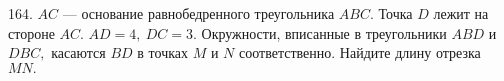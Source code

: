 164. $AC$ --- основание равнобедренного треугольника $ABC.$ Точка $D$ лежит на стороне $AC.$ $AD=4,\ DC=3.$ Окружности, вписанные в треугольники $ABD$ и $DBC,$ касаются $BD$ в точках $M$ и $N$ соответственно. Найдите длину отрезка $MN.$\\
